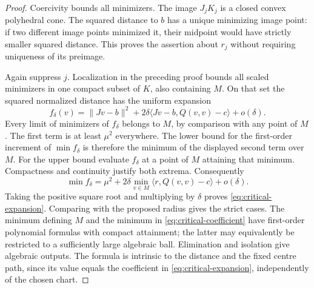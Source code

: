 \begin{proof}
Coercivity bounds all minimizers. The image $J_jK_j$ is a closed convex
polyhedral cone. The squared distance to $b$ has a unique minimizing
image point: if two different image points minimized it, their midpoint
would have strictly smaller squared distance. This proves the assertion
about $r_j$ without requiring uniqueness of its preimage.

Again suppress $j$. Localization in the preceding proof bounds all
scaled minimizers in one compact subset of $K$, also containing $M$.
On that set the squared normalized distance has the uniform expansion
\[
 f_\delta(v)=\|Jv-b\|^2+
       2\delta\langle Jv-b,Q(v,v)-c\rangle+o(\delta).
\]
Every limit of minimizers of $f_\delta$ belongs to $M$, by comparison
with any point of $M$. The first term is at least $\mu^2$ everywhere.
The lower bound for the first-order increment of $\min f_\delta$ is
therefore the minimum of the displayed second term over $M$. For the
upper bound evaluate $f_\delta$ at a point of $M$ attaining that
minimum. Compactness and continuity justify both extrema. Consequently
\[
 \min f_\delta=\mu^2+
 2\delta\min_{v\in M}\langle r,Q(v,v)-c\rangle+o(\delta).
\]
Taking the positive square root and multiplying by $\delta$ proves
\eqref{eq:critical-expansion}. Comparing with the proposed radius gives
the strict cases. The minimum defining $M$ and the minimum in
\eqref{eq:critical-coefficient} have first-order polynomial formulas
with compact attainment; the latter may equivalently be restricted to
a sufficiently large algebraic ball. Elimination and isolation give
algebraic outputs. The formula is intrinsic to the distance and the fixed
centre path, since its value equals the coefficient in
\eqref{eq:critical-expansion}, independently of the chosen chart.
\end{proof}

